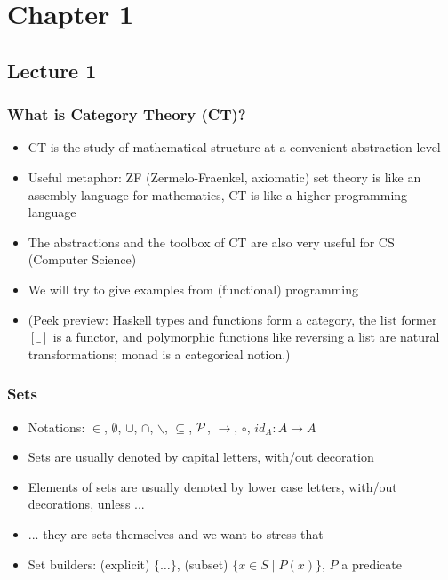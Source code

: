 \documentclass[handout]{beamer}
\title[INF210 presentations]{}
\begin{document}
\section{Chapter 1}
\subsection{Lecture 1}
 
\frame
  {   
    \frametitle{What is Category Theory (CT)?}\label{Ch1:What is CT}

 \begin{itemize}[<+->]
\item CT is the study of mathematical structure at a convenient abstraction level
\item Useful metaphor: ZF (Zermelo-Fraenkel, axiomatic) set theory is like an assembly language for mathematics, CT is like a higher programming language
\item The abstractions and the toolbox of CT are also very useful for CS (Computer Science)
\item We will try to give examples from (functional) programming
\item (Peek preview: Haskell types and functions form a category, 
the list former $[\_]$ is a functor, and polymorphic functions like reversing  a list are
natural transformations; monad is a categorical notion.)
 
 \end{itemize}

 }

\frame
  {   
    \frametitle{Sets}\label{Ch1:sets}

 \begin{itemize}[<+->]
\item Notations: $\in$, $\emptyset$, $\cup$, $\cap$, $\backslash$, 
$\subseteq$, $\operatorname{\mathcal{P}}$, $\to$, $\circ$, $id_A : A\to A$
\item Sets are usually denoted by capital letters, with/out decoration
\item Elements of sets are usually denoted by lower case letters, with/out decorations, unless ...
\item ...  they are sets themselves and we want to stress that
\item Set builders: (explicit) $\{ \ldots \}$,  (subset) $\{x \in S \mid P(x) \}$, $P$ a predicate
 \end{itemize}

 }
\end{document}
